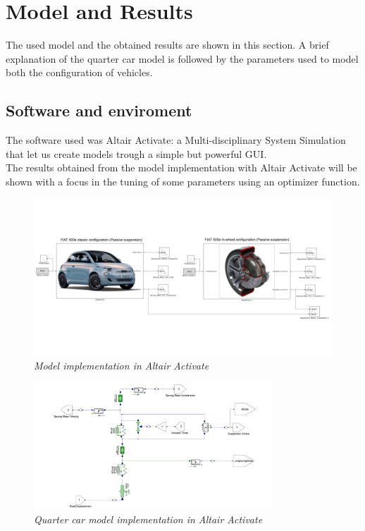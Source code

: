 \documentclass{article}
\numberwithin{equation}{section}
\numberwithin{figure}{section}
\numberwithin{table}{section}
\numberwithin{table}{section}
\begin{document}
\section{Model and Results}
The used model and the obtained results are shown in this section. A brief explanation of the quarter car model is followed by the parameters used to model both the configuration of vehicles.\\
\subsection{Software and enviroment}
The software used was Altair Activate\cite{altair_activate}: a Multi-disciplinary System Simulation that let us create models trough a simple but powerful GUI.\\
The results obtained from the model implementation with Altair Activate will be shown with a focus in the tuning of some parameters using an optimizer function.

\begin{figure}[H]
    \centering
    \includegraphics[width=1\textwidth]{Pictures/Models.png}
    \caption{\emph{Model implementation in Altair Activate}}
    \label{fig:Model}
\end{figure}

\begin{figure}[H]
    \centering
    \includegraphics[width=0.8\textwidth]{Pictures/Quarter car model.png}
    \caption{\emph{Quarter car model implementation in Altair Activate }}
    \label{fig:Quarter car}
\end{figure}
\end{document}
